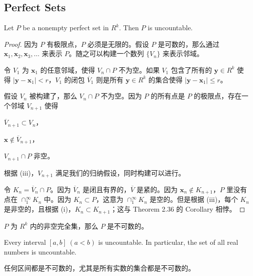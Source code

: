 \documentclass[../poma-notes.tex]{subfiles}
\begin{document}
\subsection*{Perfect Sets}

\begin{theorem}
  Let $P$ be a nonempty perfect set in $R^k$. Then $P$ is uncountable.
\end{theorem}

\begin{proof}
  因为 $P$ 有极限点，$P$ 必须是无限的。假设 $P$ 是可数的，那么通过 $\mathbf{x}_1,\mathbf{x}_2,\mathbf{x}_3,\dots$
  来表示 $P$。随之可以构建一个数列 $\{V_n\}$ 来表示邻域。

  令 $V_1$ 为 $\mathbf{x}_1$ 的任意邻域，使得 $V_n \cap P$ 不为空。如果 $V_1$ 包含了所有的 $\mathbf{y} \in R^k$ 使得
  $|\mathbf{y} - \mathbf{x}_1| < r$，$V_1$ 的闭包 $\overline{V}_1$ 则是所有 $\mathbf{y} \in R^k$ 的集合使得
  $|\mathbf{y} - \mathbf{x}_1| \le r$。

  假设 $V_n$ 被构建了，那么 $V_n \cap P$ 不为空。因为 $P$ 的所有点是 $P$ 的极限点，存在一个邻域 $V_{n+1}$ 使得
  \begin{enumerate*}[label=(\roman*)]
    \item $\overline{V}_{n+1} \subset V_n$，
    \item $\mathbf{x} \notin \overline{V}_{n+1}$，
    \item $V_{n+1} \cap P$ 非空。
  \end{enumerate*}
  根据 (iii)，$V_{n+1}$ 满足我们的归纳假设，同时构建可以进行。

  令 $K_n = \overline{V}_n \cap P$。因为 $\overline{V}_n$ 是闭且有界的，$\overline{V}$ 是紧的。因为
  $\mathbf{x}_n \notin K_{n+1}$，$P$ 里没有点在 $\cap_1^{\infty} K_n$ 中。因为 $K_n \subset P$，这意为
  $\cap_1^{\infty} K_n$ 是空的。但是根据 (iii)，每个 $K_n$ 是非空的，且根据 (i)，$K_n \subset K_{n+1}$；这与 Theorem 2.36
  的 Corollary 相悖。
\end{proof}

\anote $P$ 为 $R^k$ 内的非空完全集，那么 $P$ 是不可数的。

\begin{corollary}
  Every interval $[a,b]\ (a<b)$ is uncountable. In particular, the set of all real numbers is uncountable.
\end{corollary}

\anote 任何区间都是不可数的，尤其是所有实数的集合都是不可数的。
\end{document}
